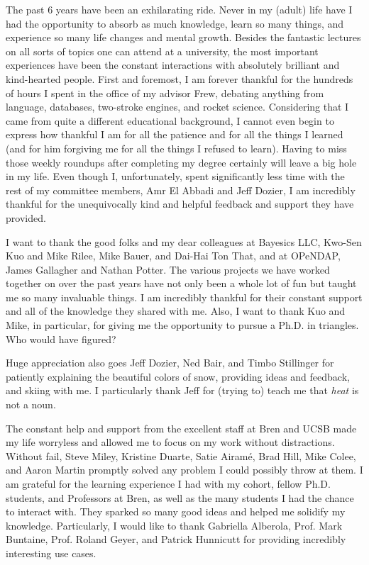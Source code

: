 \begin{acknowledgements}
The past 6 years have been an exhilarating ride. Never in my (adult) life have I had the opportunity to absorb as much knowledge, learn so many things, and experience so many life changes and mental growth.
Besides the fantastic lectures on all sorts of topics one can attend at a university, the most important experiences have been the constant interactions with absolutely brilliant and kind-hearted people. First and foremost, I am forever thankful for the hundreds of hours I spent in the office of my advisor Frew, debating anything from language, databases, two-stroke engines, and rocket science. Considering that I came from quite a different educational background, I cannot even begin to express how thankful I am for all the patience and for all the things I learned (and for him forgiving me for all the things I refused to learn). Having to miss those weekly roundups after completing my degree certainly will leave a big hole in my life. Even though I, unfortunately, spent significantly less time with the rest of my committee members, Amr El Abbadi and Jeff Dozier, I am incredibly thankful for the unequivocally kind and helpful feedback and support they have provided.

I want to thank the good folks and my dear colleagues at Bayesics LLC, Kwo-Sen Kuo and Mike Rilee, Mike Bauer, and Dai-Hai Ton That, and at OPeNDAP, James Gallagher and Nathan Potter. The various projects we have worked together on over the past years have not only been a whole lot of fun but taught me so many invaluable things. I am incredibly thankful for their constant support and all of the knowledge they shared with me. Also, I want to thank Kuo and Mike, in particular, for giving me the opportunity to pursue a Ph.D. in triangles. Who would have figured?

Huge appreciation also goes Jeff Dozier, Ned Bair, and Timbo Stillinger for patiently explaining the beautiful colors of snow, providing ideas and feedback, and skiing with me. I particularly thank Jeff for (trying to) teach me that \emph{heat} is not a noun.

The constant help and support from the excellent staff at Bren and UCSB made my life worryless and allowed me to focus on my work without distractions. Without fail, Steve Miley, Kristine Duarte, Satie Airamé, Brad Hill, Mike Colee, and Aaron Martin promptly solved any problem I could possibly throw at them. I am grateful for the learning experience I had with my cohort, fellow Ph.D. students, and Professors at Bren, as well as the many students I had the chance to interact with. They sparked so many good ideas and helped me solidify my knowledge. Particularly, I would like to thank Gabriella Alberola, Prof. Mark Buntaine, Prof. Roland Geyer, and Patrick Hunnicutt for providing incredibly interesting use cases.


\end{acknowledgements}
